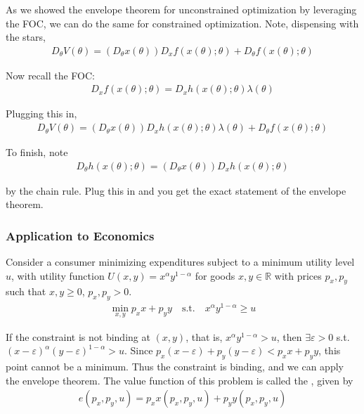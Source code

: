 \documentclass{article}
\begin{document}
\begin{remark}
  As we showed  the envelope theorem for unconstrained optimization by leveraging the FOC, we can do the same for constrained optimization. Note, dispensing with the stars,
  \begin{align*}
    D_{\theta} V(\theta)
    =
    (D_\theta x(\theta)) D_x f(x(\theta); \theta)
    +
    D_{\theta} f(x(\theta); \theta)
  \end{align*}

  Now recall the FOC:
  \begin{align*}
    D_x f(x(\theta); \theta) = D_x h(x(\theta); \theta) \lambda(\theta)
  \end{align*}

  Plugging this in,
  \begin{align*}
    D_{\theta} V(\theta)
    =
    (D_\theta x(\theta)) D_x h(x(\theta); \theta) \lambda(\theta)
    +
    D_{\theta} f(x(\theta); \theta)
  \end{align*}

  To finish, note
  \begin{align*}
    D_{\theta} h(x(\theta); \theta)
    =
    (D_\theta x(\theta)) D_x h(x(\theta); \theta)
  \end{align*}

  by the chain rule. Plug this in and you get the exact statement of the envelope theorem.
\end{remark}

\subsubsection{Application to Economics}
\label{ssub:application_to_economics}

Consider a consumer minimizing expenditures subject to a minimum utility level $u$, with utility function $U(x, y) = x^\alpha y^{1 - \alpha}$ for goods $x, y \in \mathbb{R}$ with prices $p_x, p_y$ such that $x, y \ge 0$, $p_x, p_y > 0$.
\begin{align*}
  \min_{x, y} p_x x + p_y y
  \quad\text{s.t.}\quad
  x^{\alpha} y^{1 - \alpha} \ge u
\end{align*}

If the constraint is not binding at $(x, y)$, that is, $x^{\alpha} y^{1 - \alpha} > u$, then $\exists \varepsilon > 0$ s.t.  $(x- \varepsilon)^{\alpha} (y - \varepsilon)^{1 - \alpha} > u$. Since $p_x (x - \varepsilon) + p_y(y - \varepsilon) < p_x x + p_y y$, this point cannot be a minimum. Thus the constraint is binding, and we can apply the envelope theorem. The value function of this problem is called the , given by
\begin{align*}
  e(p_x, p_y, u) = p_x x(p_x, p_y, u) + p_y y(p_x, p_y, u)
\end{align*}
\end{document}
